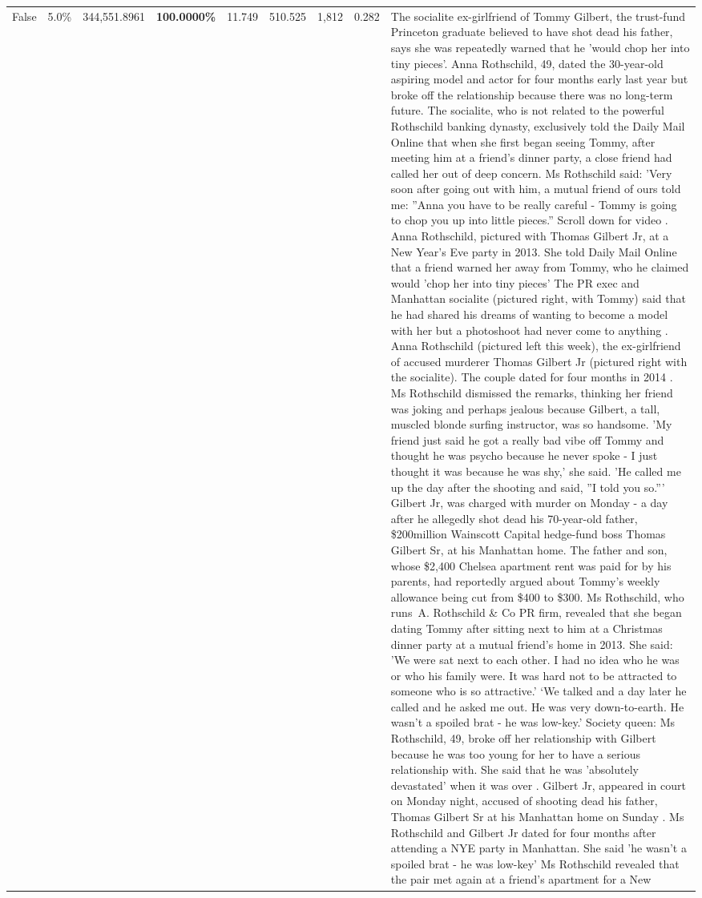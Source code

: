 \begin{table}[H]
\begin{tabular}{lllrlllll}
False & 5.0\% & 344,551.8961 & \bfseries \color{red} 100.0000\% & 11.749 & 510.525 & 1,812 & 0.282 & The socialite ex-girlfriend of Tommy Gilbert, the trust-fund Princeton graduate believed to have shot dead his father, says she was repeatedly warned that he 'would chop her into tiny pieces'. Anna Rothschild, 49, dated the 30-year-old aspiring model and actor for four months early last year but broke off the relationship because there was no long-term future. The socialite, who is not related to the powerful Rothschild banking dynasty, exclusively told the Daily Mail Online that when she first began seeing Tommy, after meeting him at a friend's dinner party, a close friend had called her out of deep concern. Ms Rothschild said: 'Very soon after going out with him, a mutual friend of ours told me: ''Anna you have to be really careful - Tommy is going to chop you up into little pieces.'' Scroll down for video . Anna Rothschild, pictured with Thomas Gilbert Jr, at a New Year's Eve party in 2013. She told Daily Mail Online that a friend warned her away from Tommy, who he claimed would 'chop her into tiny pieces' The PR exec and Manhattan socialite (pictured right, with Tommy) said that he had shared his dreams of wanting to become a model with her but a photoshoot had never come to anything . Anna Rothschild (pictured left this week), the ex-girlfriend of accused murderer Thomas Gilbert Jr (pictured right with the socialite). The couple dated for four months in 2014 . Ms Rothschild dismissed the remarks, thinking her friend was joking and perhaps jealous because Gilbert, a tall, muscled blonde surfing instructor, was so handsome. 'My friend just said he got a really bad vibe off Tommy and thought he was psycho because he never spoke - I just thought it was because he was shy,' she said. 'He called me up the day after the shooting and said, ''I told you so.''' Gilbert Jr, was charged with murder on Monday - a day after he allegedly shot dead his 70-year-old father, \$200million Wainscott Capital hedge-fund boss Thomas Gilbert Sr, at his Manhattan home. The father and son, whose \$2,400 Chelsea apartment rent was paid for by his parents, had reportedly argued about Tommy's weekly allowance being cut from \$400 to \$300. Ms Rothschild, who runs A. Rothschild \& Co PR firm, revealed that she began dating Tommy after sitting next to him at a Christmas dinner party at a mutual friend's home in 2013. She said: 'We were sat next to each other. I had no idea who he was or who his family were. It was hard not to be attracted to someone who is so attractive.' ‘We talked and a day later he called and he asked me out. He was very down-to-earth. He wasn’t a spoiled brat - he was low-key.’ Society queen: Ms Rothschild, 49, broke off her relationship with Gilbert because he was too young for her to have a serious relationship with. She said that he was 'absolutely devastated' when it was over . Gilbert Jr, appeared in court on Monday night, accused of shooting dead his father, Thomas Gilbert Sr at his Manhattan home on Sunday . Ms Rothschild and Gilbert Jr dated for four months after attending a NYE party in Manhattan. She said 'he wasn't a spoiled brat - he was low-key' Ms Rothschild revealed that the pair met again at a friend’s apartment for a New 
\end{tabular}
\end{table}
